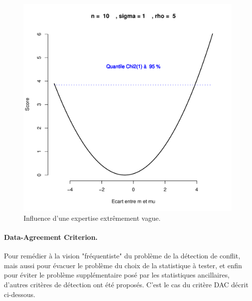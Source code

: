 \begin{figure}[hbtp]
\includegraphics[scale=0.4]{figures/prior/figure5.pdf}
\caption{Influence d'une expertise extr\^emement vague.}
\label{toto5}

\end{figure}







\paragraph{{\bf Data-Agreement Criterion}.}
Pour remédier à la vision "fréquentiste" du problème de la détection de conflit, mais aussi pour évacuer le problème du choix de la statistique à tester, et enfin pour éviter le problème supplémentaire posé par les statistiques ancillaires, d'autres critères de détection ont été proposés. C'est le cas du critère DAC décrit ci-dessous. \\

